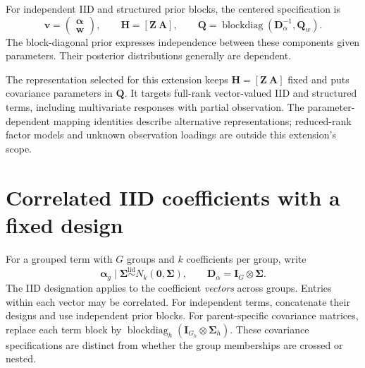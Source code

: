 \documentclass[11pt]{article}
\newcommand{\bw}{\bm{w}}
\newcommand{\bv}{\bm{v}}
\newcommand{\balpha}{\bm{\alpha}}
\newcommand{\bA}{\bm{A}}
\newcommand{\bD}{\bm{D}}
\newcommand{\bH}{\bm{H}}
\newcommand{\bI}{\bm{I}}
\newcommand{\bQ}{\bm{Q}}
\newcommand{\bZ}{\bm{Z}}
\newcommand{\bSigma}{\bm{\Sigma}}
\newcommand{\bzero}{\bm{0}}
\DeclareMathOperator{\blockdiag}{blockdiag}
\begin{document}
For independent IID and structured prior blocks, the centered specification is
\begin{equation}\label{eq:stack}
 \bv=\begin{pmatrix}\balpha\\\bw\end{pmatrix},\qquad
 \bH=[\bZ\ \bA],\qquad
 \bQ=\blockdiag(\bD_\alpha^{-1},\bQ_w).
\end{equation}
The block-diagonal prior expresses independence between these components given
parameters. Their posterior distributions generally are dependent.

The representation selected for this extension keeps $\bH=[\bZ\ \bA]$ fixed
and puts covariance parameters in $\bQ$. It targets full-rank vector-valued IID
and structured terms, including multivariate responses with partial observation.
The parameter-dependent mapping identities describe alternative representations;
reduced-rank factor models and unknown observation loadings are outside this
extension's scope.

\section{Correlated IID coefficients with a fixed design}
For a grouped term with $G$ groups and $k$ coefficients per group, write
\begin{equation}\label{eq:iid}
 \balpha_g\mid\bSigma\stackrel{\mathrm{iid}}{\sim}N_k(\bzero,\bSigma),
 \qquad \bD_\alpha=\bI_G\otimes\bSigma.
\end{equation}
The IID designation applies to the coefficient \emph{vectors} across groups.
Entries within each vector may be correlated. For independent terms, concatenate
their designs and use independent prior blocks. For parent-specific covariance
matrices, replace each term block by $\blockdiag_h(\bI_{G_h}\otimes\bSigma_h)$.
These covariance specifications are distinct from whether the group memberships
are crossed or nested.
\end{document}
